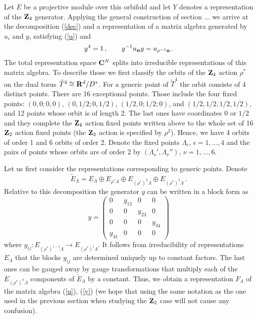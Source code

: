 \documentclass[a4paper,a4paper]{article}
\begin{document}
{Let $E$ be a projective module over this orbifold and 
  let $Y$ denotes a representation of the ${\bf Z}_{4}$ generator.  
Applying  the general construction of section ... we arrive at the decomposition (\ref{dec}) and a representation of 
a matrix algebra generated by $u_{i}$ and $y$, satisfying (\ref{u}) and 
\begin{equation} \label{y}
y^{4} = 1 \, , \qquad y^{-1}u_{\bf n}y = u_{\rho^{-1}{\bf n}} \, . 
\end{equation}
The total representation space ${\bf C}^{N}$ splits into irreducible representations of this matrix algebra. 
To describe those we first classify  the orbits of the ${\bf Z}_{4}$  action $\rho^{*}$ on the dual torus $\tilde T^{4}\cong {\bf R}^{d}/D^{*}$. 
For a generic point of  $\tilde T^{4}$ the orbit consists of 4 distinct points. 
There are 16 exceptional points. Those include the four fixed points: $(0,0;0,0)$, $(0, 1/2;0, 1/2)$, $(1/2, 0; 1/2; 0)$, and $(1/2,1/2,1/2,1/2)$,  and 
 12 points whose orbit is of length 2. The last ones  have coordinates $0$ or $1/2$ and they complete the ${\bf Z}_{4}$ 
action fixed points written above to the whole set of 16 ${\bf Z}_{2}$ action fixed points (the  ${\bf Z}_{2}$ action is specified  by $\rho^{2}$).  
Hence, we have 4 orbits of order 1 and 6 orbits of order 2. Denote the fixed points $\Lambda_{\epsilon}$, $\epsilon=1, \dots , 4$ 
and the pairs of points whose orbits are of order 2 by $(\Lambda_{\nu}', \Lambda_{\nu}'')$, $\nu=1, \dots , 6$. 


Let us first consider the representations corresponding to generic points. Denote 
$$
\tilde E_{\Lambda}=  E_{\Lambda}\oplus E_{\rho^{*}\Lambda}\oplus  E_{(\rho^{*})^{2}\Lambda}\oplus  E_{(\rho^{*})^{3}\Lambda}\, . 
$$  
Relative to this decomposition the generator $y$ can be written in a block form as 
$$
 y= \left(
\begin{array}{cccc}  
0& y_{12}&0&0 \\ 
 0 & 0& y_{23} & 0 \\
0&0&0 &y_{34} \\
y_{41}&0&0&0 
\end{array} \right) 
$$
where $y_{ij}:  E_{(\rho^{*})^{i-1}\Lambda}  \to E_{(\rho^{*})^{i}\Lambda}$. It follows from irreducibility 
of representations $E_{\Lambda}$ that the blocks $y_{ij}$ are determined uniquely up to  constant factors. 
 The last ones can be gauged away by gauge transformations that multiply each of the $E_{(\rho^{*})^{n}\Lambda}$
components of $\tilde E_{\Lambda}$ by a constant. Thus, we obtain a representation  $F_{\Lambda}$ of the matrix algebra 
(\ref{u}), (\ref{y})  (we hope that using the same notation as the one used in 
the previous section when studying the ${\bf Z}_{2}$ case will not cause any confusion). 


}
\end{document}
